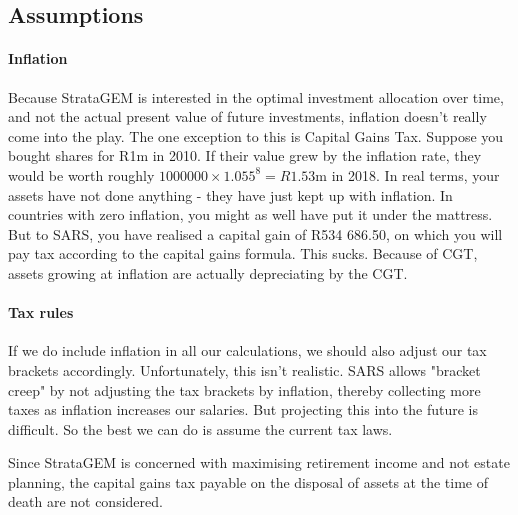 \documentclass[a4paper, justified]{tufte-handout}
\begin{document}
\subsection{Assumptions}
\paragraph{Inflation} Because StrataGEM is interested in the optimal investment allocation over time, and not the actual present value of future investments, inflation doesn't really come into the play. The one exception to this is Capital Gains Tax. Suppose you bought shares for R1m in 2010. If their value grew by the inflation rate, they would be worth roughly $1000000\times1.055^8 = R1.53$m in 2018. In real terms, your assets have not done anything - they have just kept up with inflation. In countries with zero inflation, you might as well have put it under the mattress. But to SARS, you have realised a capital gain of R534 686.50, on which you will pay tax according to the capital gains formula. This sucks. Because of CGT, assets growing at inflation are actually depreciating by the CGT.


\paragraph{Tax rules} \label{tax rules}
If we do include inflation in all our calculations, we should also adjust our tax brackets accordingly. Unfortunately, this isn't realistic. SARS allows "bracket creep" by not adjusting the tax brackets by inflation, thereby collecting more taxes as inflation increases our salaries. But projecting this into the future is difficult. So the best we can do is assume the current tax laws.

Since StrataGEM is concerned with maximising retirement income and not estate planning, the capital gains tax payable on the disposal of assets at the time of death are not considered.
\end{document}

